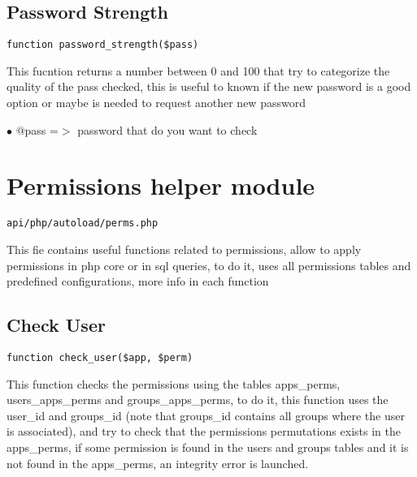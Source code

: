 \documentclass[a4paper]{book}
\begin{document}
\hypertarget{toc218}{}
\subsection{Password Strength}

\begin{lstlisting}
function password_strength($pass)
\end{lstlisting}

This fucntion returns a number between 0 and 100 that try to categorize
the quality of the pass checked, this is useful to known if the new
password is a good option or maybe is needed to request another new
password

\begin{compactitem}
\item[\color{myblue}$\bullet$] @pass =$>$ password that do you want to check
\end{compactitem}

\hypertarget{toc219}{}
\section{Permissions helper module}

\begin{lstlisting}
api/php/autoload/perms.php
\end{lstlisting}

This fie contains useful functions related to permissions, allow to apply permissions in php core
or in sql queries, to do it, uses all permissions tables and predefined configurations, more info
in each function

\hypertarget{toc220}{}
\subsection{Check User}

\begin{lstlisting}
function check_user($app, $perm)
\end{lstlisting}

This function checks the permissions using the tables apps\_perms,
users\_apps\_perms and groups\_apps\_perms, to do it, this function uses
the user\_id and groups\_id (note that groups\_id contains all groups
where the user is associated), and try to check that the permissions
permutations exists in the apps\_perms, if some permission is found
in the users and groups tables and it is not found in the apps\_perms,
an integrity error is launched.
\end{document}
